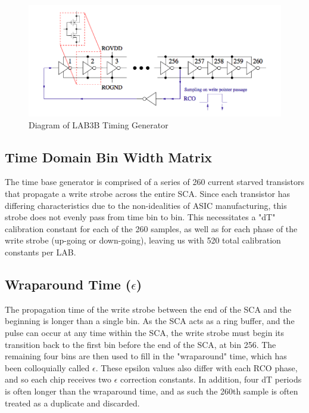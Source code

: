 \noindent		
\begin{figure}
	\includegraphics[width=\textwidth]{figures/LAB3BTimingGenerator}
	\caption{Diagram of LAB3B Timing Generator\cite{LABASICPAPER} }
\end{figure}

	\subsection{Time Domain Bin Width Matrix}
		The time base generator is comprised of a series of 260 current starved transistors that propagate a write strobe across the entire SCA.  Since each transistor has differing characteristics due to the non-idealities of ASIC manufacturing, this strobe does not evenly pass from time bin to bin.  This necessitates a "dT" calibration constant for each of the 260 samples, as well as for each phase of the write strobe (up-going or down-going), leaving us with 520 total calibration constants per LAB.
		
	\subsection{Wraparound Time ($\epsilon$)}
		The propagation time of the write strobe between the end of the SCA and the beginning is longer than a single bin.  As the SCA acts as a ring buffer, and the pulse can occur at any time within the SCA, the write strobe must begin its transition back to the first bin before the end of the SCA, at bin 256.  The remaining four bins are then used to fill in the "wraparound" time, which has been colloquially called $\epsilon$.  These epsilon values also differ with each RCO phase, and so each chip receives two $\epsilon$ correction constants. In addition, four dT periods is often longer than the wraparound time, and as such the 260th sample is often treated as a duplicate and discarded.  
		
